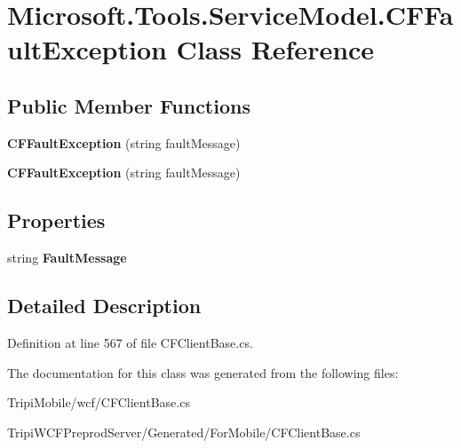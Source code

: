 \hypertarget{class_microsoft_1_1_tools_1_1_service_model_1_1_c_f_fault_exception}{
\section{Microsoft.Tools.ServiceModel.CFFaultException Class Reference}
\label{class_microsoft_1_1_tools_1_1_service_model_1_1_c_f_fault_exception}
}
\subsection*{Public Member Functions}
\begin{DoxyCompactItemize}
\item 
\hypertarget{class_microsoft_1_1_tools_1_1_service_model_1_1_c_f_fault_exception_a219df45b9cb68f27537730d71f05e844}{
{\bfseries CFFaultException} (string faultMessage)}
\label{class_microsoft_1_1_tools_1_1_service_model_1_1_c_f_fault_exception_a219df45b9cb68f27537730d71f05e844}

\item 
\hypertarget{class_microsoft_1_1_tools_1_1_service_model_1_1_c_f_fault_exception_a219df45b9cb68f27537730d71f05e844}{
{\bfseries CFFaultException} (string faultMessage)}
\label{class_microsoft_1_1_tools_1_1_service_model_1_1_c_f_fault_exception_a219df45b9cb68f27537730d71f05e844}

\end{DoxyCompactItemize}
\subsection*{Properties}
\begin{DoxyCompactItemize}
\item 
\hypertarget{class_microsoft_1_1_tools_1_1_service_model_1_1_c_f_fault_exception_a09b80c200a3a30312266a908f586b62b}{
string {\bfseries FaultMessage}}
\label{class_microsoft_1_1_tools_1_1_service_model_1_1_c_f_fault_exception_a09b80c200a3a30312266a908f586b62b}

\end{DoxyCompactItemize}


\subsection{Detailed Description}


Definition at line 567 of file CFClientBase.cs.

The documentation for this class was generated from the following files:\begin{DoxyCompactItemize}
\item 
TripiMobile/wcf/CFClientBase.cs\item 
TripiWCFPreprodServer/Generated/ForMobile/CFClientBase.cs\end{DoxyCompactItemize}
